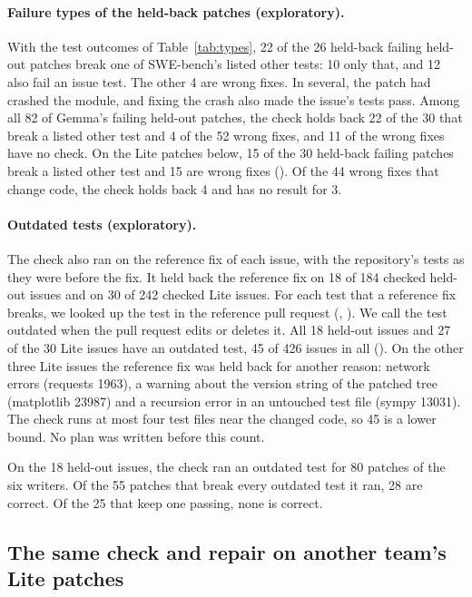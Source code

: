 \documentclass[10pt,letterpaper]{article}
\begin{document}
\paragraph{Failure types of the held-back patches (exploratory).} With the test outcomes of Table~\ref{tab:types}, 22 of
the 26 held-back failing held-out patches break one of SWE-bench's listed other tests: 10 only that, and 12 also fail
an issue test. The other 4 are wrong fixes. In several, the patch had crashed the module, and fixing the crash also made
the issue's tests pass. Among all 82 of Gemma's failing held-out patches, the check holds back 22 of the 30 that break a listed other test and 4 of the 52 wrong fixes, and 11 of the wrong fixes have no check. On the Lite patches below, 15 of the 30 held-back failing patches break a listed other test
and 15 are wrong fixes ().
Of the 44 wrong fixes that change code, the check holds back 4 and has no result for 3.

\paragraph{Outdated tests (exploratory).} The check also ran on the reference fix of each issue, with the
repository's tests as they were before the fix. It held back the reference fix on 18 of 184 checked held-out issues
and on 30 of 242 checked Lite issues. For each test that a reference fix breaks, we looked up the test in the
reference pull request (,
). We call the test outdated when the pull request edits
or deletes it. All 18 held-out issues and 27 of the 30 Lite issues have an outdated test, 45 of 426 issues in all
(). On the other three Lite issues the reference fix was held
back for another reason: network errors (requests 1963), a warning about the version string of the patched tree
(matplotlib 23987) and a recursion error in an untouched test file (sympy 13031). The check runs at most four test
files near the changed code, so 45 is a lower bound. No plan was written before this count.

On the 18 held-out issues, the check ran an outdated test for 80 patches of the six writers. Of the 55 patches that
break every outdated test it ran, 28 are correct. Of the 25 that keep one passing, none is correct.

\subsection*{The same check and repair on another team's Lite patches}
\end{document}

